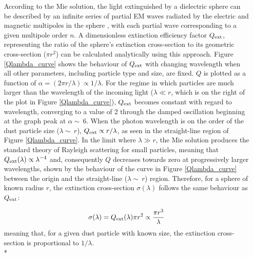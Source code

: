 \documentclass[12pt, a4paper]{report}
\begin{document}

According to the Mie solution, the light extinguished by a dielectric sphere can be described by an infinite series of partial EM waves radiated by the electric and magnetic multipoles in the sphere \citep{Grainger:04}, with each partial wave corresponding to a given multipole order $n$. A dimensionless extinction efficiency factor $Q_{\textnormal{ext}}$, representing the ratio of the sphere's extinction cross-section to its geometric cross-section ($\pi r^{2}$) can be calculated analytically using this approach. Figure \ref{Qlambda_curve} shows the behaviour of $Q_{\textnormal{ext}}$ with changing wavelength when all other parameters, including particle type and size, are fixed. $Q$ is plotted as a function of $\alpha = (2\pi r/\lambda) \propto 1/\lambda$. For the regime in which particles are much larger than the wavelength of the incoming light ($\lambda \ll r$, which is on the right of the plot in Figure \ref{Qlambda_curve}), $Q_{\textnormal{ext}}$ becomes constant with regard to wavelength, converging to a value of 2 through the damped oscillation beginning at the graph peak at $\alpha \sim\ 6$. When the photon wavelength is on the order of the dust particle size ($\lambda \sim\ r$),  $Q_{\textnormal{ext}} \propto r/\lambda$, as seen in the straight-line region of Figure \ref{Qlambda_curve}. In the limit where $\lambda \gg r$, the Mie solution produces the standard theory of Rayleigh scattering for small particles, meaning that $Q_{\textnormal{ext}}(\lambda) \propto \lambda^{-4}$ and, consequently $Q$ decreases towards zero at progressively larger wavelengths, shown by the behaviour of the curve in Figure \ref{Qlambda_curve} between the origin and the straight-line ($\lambda \sim\ r$) region. Therefore, for a sphere of known radius $r$, the extinction cross-section $\sigma(\lambda)$ follows the
same behaviour as $Q_{\textnormal{ext}}$:
 
\begin{equation}
\sigma(\lambda) = Q_{\textnormal{ext}}(\lambda){\pi r^{2}} \propto \frac{\pi r^{3}}{\lambda}
\label{x_section_wavelength}
\end{equation}
meaning that, for a given dust particle with known size, the extinction cross-section is proportional to $1/\lambda$. \\*
\end{document}
